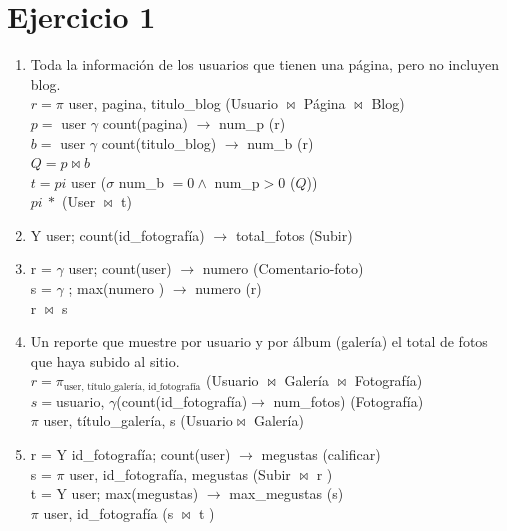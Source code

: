 \documentclass[a4paper, 12pt]{report}
\begin{document}
\section*{Ejercicio 1}{
\begin{enumerate}[label=\alph*)]
\item{Toda la información de los usuarios que tienen una página, pero no
        incluyen blog.\\
    $r = \pi$ user,  pagina, titulo\_blog (Usuario $\Join$ Página $\Join$ Blog)\\
    $p = $ user $\gamma$ count(pagina) $\rightarrow$ num\_p (r)\\
    $b = $ user $\gamma$ count(titulo\_blog) $\rightarrow$ num\_b (r)\\
    $Q = p \Join b$\\
    $t =pi$ user ($\sigma$ num\_b $= 0 \wedge$ num\_p$ > 0$ ($Q$))\\
    $pi\ *$ (User $\Join$ t)
    }
\item{Y user; count(id\_fotografía) $\rightarrow$ total\_fotos (Subir)\\}
\item{r = $\gamma$ user; count(user) $\rightarrow$ numero (Comentario-foto)\\
      s = $\gamma$ ; max(numero ) $\rightarrow$ numero (r)\\
      r $\Join$ s
}
\item{Un reporte que muestre por usuario y por álbum (galería) el total de fotos
        que haya subido al sitio.\\
    $r = \pi_{\text{user, título\_galería, id\_fotografía}}$ (Usuario $\Join$
        Galería $\Join$ Fotografía)\\
    $s =$usuario,  $\gamma$(count(id\_fotografía)$\rightarrow$ num\_fotos)
        (Fotografía)\\
    $\pi $ user, título\_galería, s (Usuario$\Join$ Galería)
}
\item{r = Y id\_fotografía; count(user) $\rightarrow$ megustas (calificar)\\
    s = $\pi$ user, id\_fotografía, megustas (Subir $\Join$ r )\\
    t = Y user; max(megustas) $\rightarrow$ max\_megustas (s)\\
    $\pi$ user, id\_fotografía (s $\Join$ t )
}
\end{enumerate}
}
\end{document}
